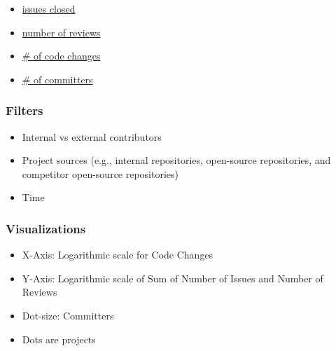 \begin{itemize}
\tightlist
\item
  \href{https://github.com/chaoss/wg-evolution/blob/master/metrics/Issues_Closed.md}{issues
  closed}
\item
  \href{https://github.com/chaoss/wg-evolution/blob/master/metrics/Reviews.md}{number
  of reviews}
\item
  \href{https://github.com/chaoss/wg-evolution/blob/master/metrics/Code_Changes.md}{\#
  of code changes}
\item
  \href{https://github.com/chaoss/wg-risk/blob/master/metrics/Committers.md}{\#
  of committers}
\end{itemize}

\hypertarget{filters}{%
\subsubsection{Filters}\label{filters}}

\begin{itemize}
\tightlist
\item
  Internal vs external contributors
\item
  Project sources (e.g., internal repositories, open-source
  repositories, and competitor open-source repositories)
\item
  Time
\end{itemize}

\hypertarget{visualizations}{%
\subsubsection{Visualizations}\label{visualizations}}

\begin{itemize}
\tightlist
\item
  X-Axis: Logarithmic scale for Code Changes
\item
  Y-Axis: Logarithmic scale of Sum of Number of Issues and Number of
  Reviews
\item
  Dot-size: Committers
\item
  Dots are projects
\end{itemize}


